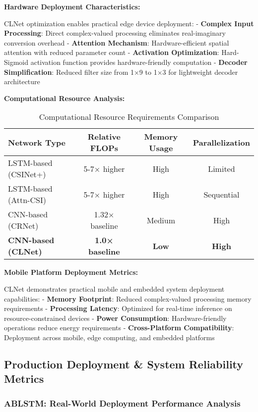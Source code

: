 \documentclass[journal]{IEEEtran}
\begin{document}
{\textbf{Hardware Deployment Characteristics:}

CLNet optimization enables practical edge device deployment:
- \textbf{Complex Input Processing}: Direct complex-valued processing eliminates real-imaginary conversion overhead
- \textbf{Attention Mechanism}: Hardware-efficient spatial attention with reduced parameter count
- \textbf{Activation Optimization}: Hard-Sigmoid activation function provides hardware-friendly computation
- \textbf{Decoder Simplification}: Reduced filter size from 1×9 to 1×3 for lightweight decoder architecture

\textbf{Computational Resource Analysis:}

\begin{table}[h]
\centering
\begin{tabular}{|l|c|c|c|}
\hline
\textbf{Network Type} & \textbf{Relative FLOPs} & \textbf{Memory Usage} & \textbf{Parallelization} \\
\hline
LSTM-based (CSINet+) & 5-7× higher & High & Limited \\
LSTM-based (Attn-CSI) & 5-7× higher & High & Sequential \\
CNN-based (CRNet) & 1.32× baseline & Medium & High \\
\textbf{CNN-based (CLNet)} & \textbf{1.0× baseline} & \textbf{Low} & \textbf{High} \\
\hline
\end{tabular}
\caption{Computational Resource Requirements Comparison}
\label{tab:resource_comparison}
\end{table}

\textbf{Mobile Platform Deployment Metrics:}

CLNet demonstrates practical mobile and embedded system deployment capabilities:
- \textbf{Memory Footprint}: Reduced complex-valued processing memory requirements
- \textbf{Processing Latency}: Optimized for real-time inference on resource-constrained devices
- \textbf{Power Consumption}: Hardware-friendly operations reduce energy requirements
- \textbf{Cross-Platform Compatibility}: Deployment across mobile, edge computing, and embedded platforms

\subsection{Production Deployment \& System Reliability Metrics}

\subsubsection{ABLSTM: Real-World Deployment Performance Analysis}

}
\end{document}
